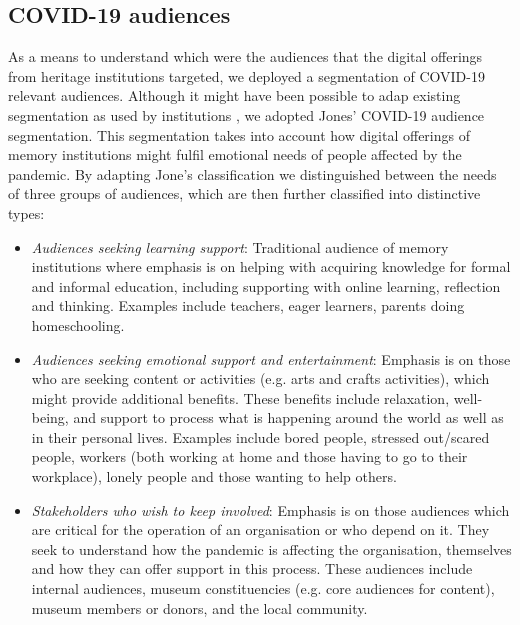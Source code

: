 \documentclass{egpubl}
\begin{document}
\subsection{COVID-19 audiences}
\label{covaud}
As a means to understand which were the audiences that the digital offerings from heritage institutions targeted, we deployed a segmentation of COVID-19 relevant audiences. Although it might have been possible to adap existing segmentation as used by institutions \cite{Drot19}, we adopted Jones' \cite{Audiences2020} COVID-19 audience segmentation. This segmentation takes into account how digital offerings of memory institutions might fulfil emotional needs of people affected by the pandemic. By adapting Jone's classification we distinguished between the needs of three groups of audiences, which are then further classified into distinctive types: 

\begin{itemize}
	\item \textit{Audiences seeking learning support}: Traditional audience of memory institutions where emphasis is on helping with acquiring knowledge for formal and informal education, including supporting with online learning, reflection and thinking. Examples include teachers, eager learners, parents doing homeschooling.
	\item \textit{Audiences seeking emotional support and entertainment}: Emphasis is on those who are seeking content or activities (e.g. arts and crafts activities), which might provide additional benefits. These benefits include relaxation, well-being, and support to process what is happening around the world as well as in their personal lives. Examples include bored people, stressed out/scared people, workers (both working at home and those having to go to their workplace), lonely people and those wanting to help others. 
	\item \textit{Stakeholders who wish to keep involved}: Emphasis is on those audiences which are critical for the operation of an organisation or who depend on it. They seek to understand how the pandemic is affecting the organisation, themselves and how they can offer support in this process. These audiences include internal audiences, museum constituencies (e.g. core audiences for content), museum members or donors, and the local community.
\end{itemize}
\end{document}
